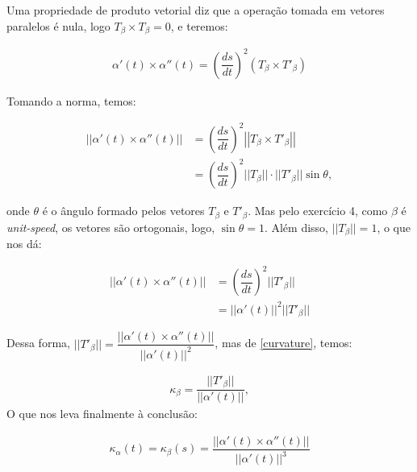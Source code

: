 \documentclass[12pt,letterpaper]{article}
\begin{document}
\begin{enumerate}
	Uma propriedade de produto vetorial diz que a operação tomada em vetores paralelos é nula, logo $T_\beta\times T_\beta=0$, e teremos:
	
	\begin{align}\alpha'(t)\times\alpha''(t)=\left(\dfrac{ds}{dt}\right)^2(T_\beta\times T'_\beta)\label{cross}\end{align}
	
	Tomando a norma, temos:
	
	\begin{align*}
		||\alpha'(t)\times\alpha''(t)||&=\left(\dfrac{ds}{dt}\right)^2\left|\left|T_\beta\times T'_\beta\right|\right|\\
		&=\left(\dfrac{ds}{dt}\right)^2||T_\beta||\cdot||T'_\beta||\sin\theta,
	\end{align*}

	onde $\theta$ é o ângulo formado pelos vetores $T_\beta$ e $T'_\beta$. Mas pelo exercício 4, como $\beta$ é \textit{unit-speed}, os vetores são ortogonais, logo, $\sin\theta=1$. Além disso, $||T_\beta||=1$, o que nos dá:
	
	\begin{align*}
		||\alpha'(t)\times\alpha''(t)||&=\left(\dfrac{ds}{dt}\right)^2||T'_\beta||\\
		&=||\alpha'(t)||^2||T'_\beta||
	\end{align*}

	Dessa forma, $||T'_\beta||=\dfrac{||\alpha'(t)\times\alpha''(t)||}{||\alpha'(t)||^2}$, mas de \ref{curvature}, temos:
	
	\begin{align}
		\kappa_{\beta}=\dfrac{||T'_\beta||}{||\alpha'(t)||},\label{curv2}
	\end{align}	
	O que nos leva finalmente à conclusão:
	
	\begin{align*}
		\kappa_{\alpha}(t)=\kappa_{\beta}(s)=\dfrac{||\alpha'(t)\times\alpha''(t)||}{||\alpha'(t)||^3}
	\end{align*}
%	


\end{enumerate}
\end{document}
